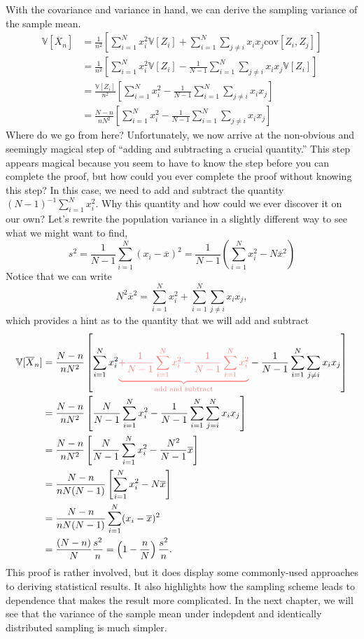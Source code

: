 \documentclass[
  letterpaper,
  DIV=11,
  numbers=noendperiod]{scrreprt}
\newcommand{\V}{\mathbb{V}}
\newcommand{\cov}{\text{cov}}
\newcommand{\Xbar}{\overline{X}}
\theoremstyle{definition}
\theoremstyle{definition}
\theoremstyle{plain}
\theoremstyle{remark}
\begin{document}
With the covariance and variance in hand, we can derive the sampling
variance of the sample mean. \[
\begin{aligned}
\V[\Xbar_{n}] &=  \frac{1}{n^2}\left[\sum_{i=1}^N x_i^2\V[Z_i] + \sum_{i=1}^N\sum_{j\neq i} x_ix_j\cov[Z_i,Z_j]\right] \\
&=  \frac{1}{n^2}\left[\sum_{i=1}^N x_i^2\V[Z_i] - \frac{1}{N-1} \sum_{i=1}^N\sum_{j\neq i} x_ix_j\V[Z_i]\right] \\
&=  \frac{\V[Z_i]}{n^2}\left[\sum_{i=1}^N x_i^2 - \frac{1}{N-1} \sum_{i=1}^N\sum_{j\neq i} x_ix_j\right] \\
&=  \frac{N-n}{nN^2}\left[\sum_{i=1}^N x_i^2 - \frac{1}{N-1} \sum_{i=1}^N\sum_{j\neq i} x_ix_j\right]
\end{aligned}
\] Where do we go from here? Unfortunately, we now arrive at the
non-obvious and seemingly magical step of ``adding and subtracting a
crucial quantity.'' This step appears magical because you seem to have
to know the step before you can complete the proof, but how could you
ever complete the proof without knowing this step? In this case, we need
to add and subtract the quantity \((N-1)^{-1} \sum_{i=1}^N x_i^2\). Why
this quantity and how could we ever discover it on our own? Let's
rewrite the population variance in a slightly different way to see what
we might want to find, \[
s^2 = \frac{1}{N-1}\sum_{i=1}^N (x_i - \overline{x})^2 = \frac{1}{N-1} \left(\sum_{i=1}^N x_i^2  - N\overline{x}^2\right)
\] Notice that we can write \[
N^2\overline{x}^2 = \sum_{i=1}^N x_i^2 + \sum_{i=1}^N \sum_{j\neq i} x_ix_j, 
\] which provides a hint as to the quantity that we will add and
subtract \[
\begin{aligned}
\V[\Xbar_{n}] &=  \frac{N-n}{nN^2}\left[\sum_{i=1}^N x_i^2  \textcolor{red!50}{\underbrace{+ \frac{1}{N-1}\sum_{i=1}^N x_i^2 - \frac{1}{N-1}\sum_{i=1}^N x_i^2}_{\text{add and subtract}}} - \frac{1}{N-1} \sum_{i=1}^N\sum_{j\neq i} x_ix_j\right] \\
&=  \frac{N-n}{nN^2}\left[\frac{N}{N-1}\sum_{i=1}^N x_i^2  - \frac{1}{N-1} \sum_{i=1}^N\sum_{j=i}^N x_ix_j\right] \\
&=  \frac{N-n}{nN^2}\left[\frac{N}{N-1}\sum_{i=1}^N x_i^2  - \frac{N^2}{N-1} \overline{x}\right] \\
&=  \frac{N-n}{nN(N-1)}\left[\sum_{i=1}^N x_i^2  - N \overline{x}\right] \\
&=  \frac{N-n}{nN(N-1)}\sum_{i=1}^N (x_i - \overline{x})^2 \\
&= \frac{(N-n)}{N}\frac{s^2}{n} = \left(1 - \frac{n}{N}\right)\frac{s^2}{n}.
\end{aligned}
\] This proof is rather involved, but it does display some commonly-used
approaches to deriving statistical results. It also highlights how the
sampling scheme leads to dependence that makes the result more
complicated. In the next chapter, we will see that the variance of the
sample mean under indepdent and identically distributed sampling is much
simpler.
\end{document}
